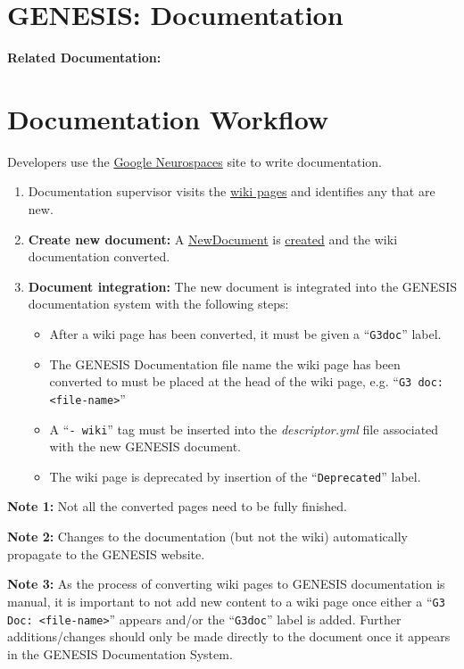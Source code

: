 \documentclass[12pt]{article}
\begin{document}
\section*{GENESIS: Documentation}

{\bf Related Documentation:}

\section*{Documentation Workflow}

Developers use the \href{http://code.google.com/p/neurospaces/wiki/Index}{Google Neurospaces} site to write documentation.
\begin{enumerate}
\item Documentation supervisor visits the \href{http://code.google.com/p/neurospaces/w/list}{wiki pages} and identifies any that are new.
\item{\bf Create new document:} A \href{../NewDocument/NewDocument.tex}{NewDocument} is \href{../document-create/document-create.tex}{created} and the wiki documentation converted.
\item{\bf Document integration:} The new document is integrated into the GENESIS documentation system with the following steps:
\begin{itemize}
\item  After a wiki page has been converted, it must be given a ``{\tt G3doc}'' label.
\item The GENESIS Documentation file name the wiki page has been converted to must be placed at the head of the wiki page, e.g. ``{\tt G3 doc: <file-name>}''
\item A ``{\tt -\,wiki}'' tag must be inserted into the {\it descriptor.yml} file associated with the new GENESIS document.
\item The wiki page is deprecated by insertion of the ``{\tt Deprecated}'' label.
\end{itemize}
\end{enumerate}

{\bf Note 1:} Not all the converted pages need to be fully finished.

{\bf Note 2:} Changes to the documentation (but not the wiki) automatically propagate to the GENESIS website.

{\bf Note 3:} As the process of converting wiki pages to GENESIS documentation is manual, it is important to not add new content to a wiki page once either a ``{\tt G3 Doc: <file-name>}'' appears and/or the ``{\tt G3doc}'' label is added. Further additions/changes should only be made directly to the document once it appears in the GENESIS Documentation System.
\end{document}
